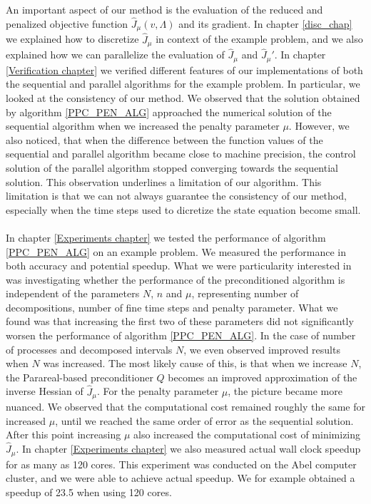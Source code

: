 \\
\\
An important aspect of our method is the evaluation of the reduced and penalized objective function $\hat J_{\mu}(v,\Lambda)$ and its gradient. In chapter \ref{disc_chap} we explained how to discretize $\hat J_{\mu}$ in context of the example problem, and we also explained how we can parallelize the evaluation of $\hat J_{\mu}$ and $\hat J_{\mu}'$. In chapter \ref{Verification chapter} we verified different features of our implementations of both the sequential and parallel algorithms for the example problem. In particular, we looked at the consistency of our method. We observed that the solution obtained by algorithm \ref{PPC_PEN_ALG} approached the numerical solution of the sequential algorithm when we increased the penalty parameter $\mu$. However, we also noticed, that when the difference between the function values of the sequential and parallel algorithm became close to machine precision, the control solution of the parallel algorithm stopped converging towards the sequential solution. This observation underlines a limitation of our algorithm. This limitation is that we can not always guarantee the consistency of our method, especially when the time steps used to dicretize the state equation become small.
\\
\\
In chapter \ref{Experiments chapter} we tested the performance of algorithm \ref{PPC_PEN_ALG} on an example problem. We measured the performance in both accuracy and potential speedup. What we were particularity interested in was investigating whether the performance of the preconditioned algorithm is independent of the parameters $N$, $n$ and $\mu$, representing number of decompositions, number of fine time steps and penalty parameter. What we found was that increasing the first two of these parameters did not significantly worsen the performance of algorithm \ref{PPC_PEN_ALG}. In the case of number of processes and decomposed intervals $N$, we even observed improved results when $N$ was increased. The most likely cause of this, is that when we increase $N$, the Parareal-based preconditioner $Q$ becomes an improved approximation of the inverse Hessian of $\hat J_{\mu}$. For the penalty parameter $\mu$, the picture became more nuanced. We observed that the computational cost remained roughly the same for increased $\mu$, until we reached the same order of error as the sequential solution. After this point increasing $\mu$ also increased the computational cost of minimizing $\hat J_{\mu}$. In chapter \ref{Experiments chapter} we also measured actual wall clock speedup for as many as 120 cores. This experiment was conducted on the Abel computer cluster, and we were able to achieve actual speedup. We for example obtained a speedup of 23.5 when using 120 cores. 
